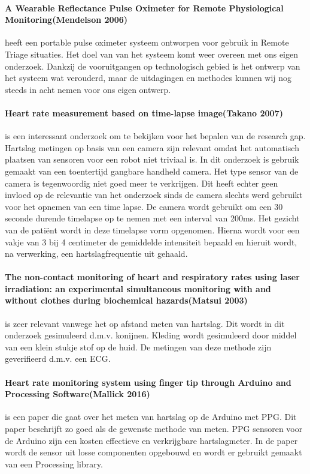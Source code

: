 \documentclass[11pt]{article}
\begin{document}
    \paragraph{A Wearable Reflectance Pulse Oximeter for Remote Physiological Monitoring(Mendelson 2006)} heeft een portable pulse oximeter systeem ontworpen voor gebruik in Remote Triage situaties. 
    Het doel van van het systeem komt weer overeen met ons eigen onderzoek. 
    Dankzij de vooruitgangen op technologisch gebied is het ontwerp van het systeem wat verouderd, maar de uitdagingen en methodes kunnen wij nog steeds in acht nemen voor ons eigen ontwerp.

    \paragraph{Heart rate measurement based on time-lapse image(Takano 2007)} is een interessant onderzoek om te bekijken voor het bepalen van de research gap. 
    Hartslag metingen op basis van een camera zijn relevant omdat het automatisch plaatsen van sensoren voor een robot niet triviaal is. 
    In dit onderzoek is gebruik gemaakt van een toentertijd gangbare handheld camera. 
    Het type sensor van de camera is tegenwoordig niet goed meer te verkrijgen. 
    Dit heeft echter geen invloed op de relevantie van het onderzoek sinds de camera slechts werd gebruikt voor het opnemen van een time lapse. 
    De camera wordt gebruikt om een 30 seconde durende timelapse op te nemen met een interval van 200ms. 
    Het gezicht van de patiënt wordt in deze timelapse vorm opgenomen. 
    Hierna wordt voor een vakje van 3 bij 4 centimeter de gemiddelde intensiteit bepaald en hieruit wordt, na verwerking, een hartslagfrequentie uit gehaald.

    \paragraph{The non-contact monitoring of heart and respiratory rates using laser irradiation: an experimental simultaneous monitoring with and without clothes during biochemical hazards(Matsui 2003)} is zeer relevant vanwege het op afstand meten van hartslag. 
    Dit wordt in dit onderzoek gesimuleerd d.m.v. konijnen. Kleding wordt gesimuleerd door middel van een klein stukje stof op de huid. 
    De metingen van deze methode zijn geverifieerd d.m.v. een ECG.

    \paragraph{Heart rate monitoring system using finger tip through Arduino and Processing Software(Mallick 2016)} is een paper die gaat over het meten van hartslag op de Arduino met PPG. 
    Dit paper beschrijft zo goed als de gewenste methode van meten. 
    PPG sensoren voor de Arduino zijn een kosten effectieve en verkrijgbare hartslagmeter. 
    In de paper wordt de sensor uit losse componenten opgebouwd en wordt er gebruikt gemaakt van een Processing library.
\end{document}
